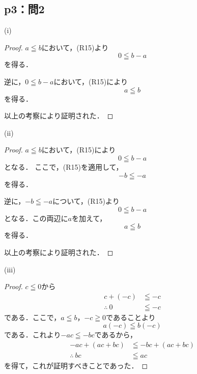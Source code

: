 \documentclass[a4paper,10pt,fleqn]{ltjsarticle}
\begin{document}
\subsection*{p3：問2}

\begin{itembox}[c]{(i)}
    \begin{proof}
        $a \leqq b$において，(R15)より
        \[
            0 \leqq b-a
        \]
        を得る．

        逆に，$0 \leqq b-a$において，(R15)により
        \[
            a \leqq b 
        \]
        を得る．

        以上の考察により証明された．
    \end{proof}
    \end{itembox}

    \begin{itembox}[c]{(ii)}
        \begin{proof}
            $a \leqq b$において，(R15)により
            \[
                0 \leqq b-a
            \]
            となる．
            ここで，(R15)を適用して，
            \[
                -b \leqq -a
            \]
            を得る．

            逆に，$-b\leqq -a$について，(R15)より
            \[
                0 \leqq b -a
            \]
            となる．この両辺に$a$を加えて，
            \[
                a \leqq b 
            \]
            を得る．

            以上の考察により証明された．
        \end{proof}
        \end{itembox}

    \newpage 

    \begin{itembox}[c]{(iii)}
        \begin{proof}
            $c \leqq 0$から
            \begin{align*} 
                 c+(-c) &\leqq -c \\
                \therefore ~ 0 &\leqq -c 
            \end{align*} 
            である．ここで，$a \leqq b$，$-c \geqq 0$であることより
            \[
                a(-c) \leqq b (-c)
            \]
            である．これより$ -ac \leqq -bc$であるから，
            \begin{align*} 
                -ac + (ac+bc) &\leqq -bc +(ac+bc) \\
                \therefore ~ bc &\leqq ac 
            \end{align*} 
            を得て，これが証明すべきことであった．
        \end{proof}
    \end{itembox}
\end{document}
